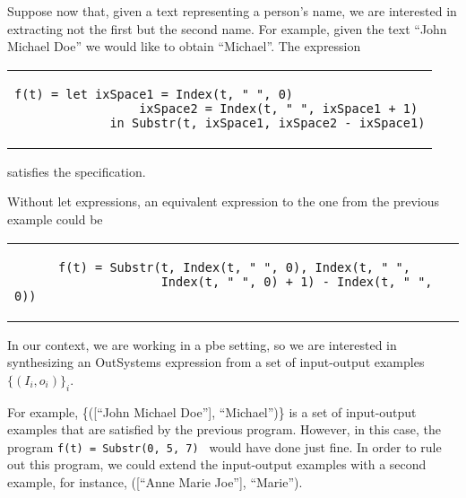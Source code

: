 \begin{example}
  Suppose now that, given a text representing a person's name, we are interested
in extracting not the first but the second name. For example, given the text
``John Michael Doe'' we would like to obtain ``Michael''. The expression
 
\begin{center}
  \begin{tabular}{l}
    \begin{lstlisting}[xleftmargin=10em]
      f(t) = let ixSpace1 = Index(t, " ", 0)
                 ixSpace2 = Index(t, " ", ixSpace1 + 1)
             in Substr(t, ixSpace1, ixSpace2 - ixSpace1)
    \end{lstlisting}
  \end{tabular}
\end{center}

\noindent
satisfies the specification.
\end{example}

Without let expressions, an equivalent expression to the one from the previous
example could be

\begin{center}
  \begin{tabular}{l}
    \begin{lstlisting}
      f(t) = Substr(t, Index(t, " ", 0), Index(t, " ",
                    Index(t, " ", 0) + 1) - Index(t, " ", 0))
    \end{lstlisting}
  \end{tabular}
\end{center}

In our context, we are working in a \gls{pbe} setting, so we are interested in
synthesizing an OutSystems expression from a set of input-output examples
$\{(I_i, o_i)\}_i$.

For example, \{([``John Michael Doe''], ``Michael'')\} is a set of input-output
examples that are satisfied by the previous program. However, in this case, the
program \lstinline{f(t) = Substr(0, 5, 7) } would have done just fine. In order
to rule out this program, we could extend the input-output examples with a
second example, for instance, ([``Anne Marie Joe''], ``Marie'').

